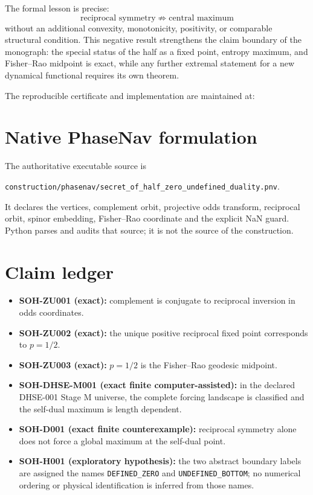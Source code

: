 
The formal lesson is precise:
\[
\boxed{
\text{reciprocal symmetry}
\;\not\Rightarrow\;
\text{central maximum}
}
\]
without an additional convexity, monotonicity, positivity, or comparable
structural condition. This negative result strengthens the claim boundary of
the monograph: the special status of the half as a fixed point, entropy maximum,
and Fisher--Rao midpoint is exact, while any further extremal statement for a
new dynamical functional requires its own theorem.

The reproducible certificate and implementation are maintained at:
\par{}\par
{}\par

\section{Native PhaseNav formulation}

The authoritative executable source is
\begin{center}
\texttt{construction/phasenav/secret\_of\_half\_zero\_undefined\_duality.pnv}.
\end{center}
It declares the vertices, complement orbit, projective odds transform,
reciprocal orbit, spinor embedding, Fisher--Rao coordinate and the explicit
NaN guard. Python parses and audits that source; it is not the source of the
construction.

\section{Claim ledger}

\begin{itemize}
\item \textbf{SOH-ZU001 (exact):} complement is conjugate to reciprocal inversion
in odds coordinates.
\item \textbf{SOH-ZU002 (exact):} the unique positive reciprocal fixed point
corresponds to $p=1/2$.
\item \textbf{SOH-ZU003 (exact):} $p=1/2$ is the Fisher--Rao geodesic midpoint.
\item \textbf{SOH-DHSE-M001 (exact finite computer-assisted):} in the declared
DHSE-001 Stage M universe, the complete forcing landscape is classified and the
self-dual maximum is length dependent.
\item \textbf{SOH-D001 (exact finite counterexample):} reciprocal symmetry alone
does not force a global maximum at the self-dual point.
\item \textbf{SOH-H001 (exploratory hypothesis):} the two abstract boundary labels
are assigned the names \texttt{DEFINED\_ZERO} and \texttt{UNDEFINED\_BOTTOM};
no numerical ordering or physical identification is inferred from those names.
\end{itemize}

